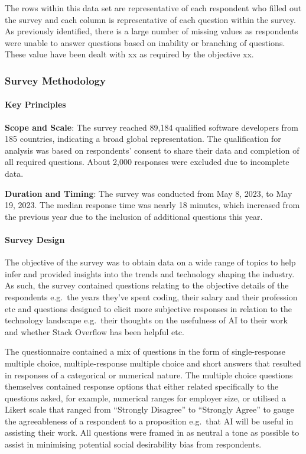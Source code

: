 \documentclass[
  12pt,
]{article}
\begin{document}
The rows within this data set are representative of each respondent who
filled out the survey and each column is representative of each question
within the survey. As previously identified, there is a large number of
missing values as respondents were unable to answer questions based on
inability or branching of questions. These value have been dealt with xx
as required by the objective xx.

\hypertarget{survey-methodology}{%
\subsubsection{Survey Methodology}\label{survey-methodology}}

\hypertarget{key-principles}{%
\paragraph{Key Principles}\label{key-principles}}

\textbf{Scope and Scale}: The survey reached 89,184 qualified software
developers from 185 countries, indicating a broad global representation.
The qualification for analysis was based on respondents' consent to
share their data and completion of all required questions. About 2,000
responses were excluded due to incomplete data.

\textbf{Duration and Timing}: The survey was conducted from May 8, 2023,
to May 19, 2023. The median response time was nearly 18 minutes, which
increased from the previous year due to the inclusion of additional
questions this year.

\hypertarget{survey-design}{%
\paragraph{Survey Design}\label{survey-design}}

The objective of the survey was to obtain data on a wide range of topics
to help infer and provided insights into the trends and technology
shaping the industry. As such, the survey contained questions relating
to the objective details of the respondents e.g.~the years they've spent
coding, their salary and their profession etc and questions designed to
elicit more subjective responses in relation to the technology landscape
e.g.~their thoughts on the usefulness of AI to their work and whether
Stack Overflow has been helpful etc.

The questionnaire contained a mix of questions in the form of
single-response multiple choice, multiple-response multiple choice and
short answers that resulted in responses of a categorical or numerical
nature. The multiple choice questions themselves contained response
options that either related specifically to the questions asked, for
example, numerical ranges for employer size, or utilised a Likert scale
that ranged from ``Strongly Disagree'' to ``Strongly Agree'' to gauge
the agreeableness of a respondent to a proposition e.g.~that AI will be
useful in assisting their work. All questions were framed in as neutral
a tone as possible to assist in minimising potential social desirability
bias from respondents.
\end{document}
